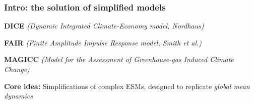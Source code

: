 \documentclass[xcolor=x11names,compress,aspectratio=169]{beamer}%
\makeatletter
\renewenvironment{itemize}{\begin{compactitemize}[<+-| alert@+>]}{\end{compactitemize}}
\makeatother
\begin{document}
\begin{frame}%
%

\frametitle{Intro: the solution of simplified models}%


\begin{itemize}
\item \textbf{DICE} \textit{(Dynamic Integrated Climate-Economy model,
Nordhaus)}

\item \textbf{FAIR} \textit{(Finite Amplitude Impulse Response model, Smith et
al.)}

\item \textbf{MAGICC} \textit{(Model for the Assessment of Greenhouse-gas
Induced Climate Change)}
\end{itemize}

\vspace{0.3cm} \textbf{Core idea:} Simplifications of complex ESMs, designed
to replicate \emph{global mean dynamics}\vspace{0.3cm}%

\transboxout
\end{frame}%
%
\end{document}
